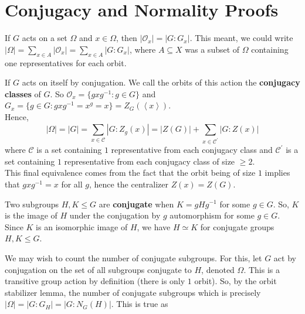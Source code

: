  \section{Conjugacy and Normality Proofs}
\begin{recall}
	If \(G\) acts on a set \(\Omega\) and \(x \in \Omega\), then \(\left| \mathscr{O}_{x} \right| = \left| G : G_{x} \right| \). This meant, we could write \(\left| \Omega \right| = \sum_{x \in A}^{} \left| \mathscr{O}_{x} \right| = \sum_{x \in A}^{}  \left| G : G_{x} \right|  \), where \(A \subseteq X\) was a subset of \(\Omega\) containing one representatives for each orbit.
\end{recall}
\begin{example}
	If \(G\) acts on itself by conjugation. We call the orbits of this action the \textbf{conjugacy classes} of \(G\). So \(\mathscr{O}_{x} = \{gxg^{-1} : g \in G\} \) and \\\(G_{x} = \{g \in G :  gxg^{-1} = x^{g} = x\} = Z_{G} \left( \left<x \right>  \right)  \).\\
	Hence, \[\left| \Omega \right| = \left| G \right| = \sum_{x \in \mathscr{C}}^{} \left| G: Z_{g}\left( x \right)  \right| = \left| Z\left( G \right)  \right|  + \sum_{x \in \mathscr{C}^{\prime}}^{}\left| G : Z\left( x \right)  \right|  \] where \(\mathscr{C}\) is a set containing \(1\) representative from each conjugacy class and \(\mathscr{C}^{\prime}\) is a set containing \(1\) representative from each conjugacy class of size \(\ge 2\).\\
	This final equivalence comes from the fact that the orbit being of size \(1\) implies that \(gxg^{-1} = x\) for all \(g\), hence the centralizer \(Z\left( x \right)  = Z\left( G \right) \).
\end{example}
\begin{definition}
	Two subgroups \(H, K \le G\) are \textbf{conjugate} when \(K = gHg^{-1}\) for some \(g \in G\). So, \(K\) is the image of \(H\) under the conjugation by \(g\) automorphism for some \(g \in G\). Since \(K\) is an isomorphic image of \(H\), we have \(H \simeq K\) for conjugate groups \(H, K \le G\).
\end{definition}
We may wish to count the number of conjugate subgroups. For this, let \(G\) act by conjugation on the set of all subgroups conjugate to \(H\), denoted \(\Omega\). This is a transitive group action by definition (there is only \(1\) orbit). So, by the orbit stabilizer lemma, the number of conjugate subgroups which is precisely \(\left| \Omega \right| = \left| G : G_{H} \right|  = \left| G : N_{G}\left( H \right)  \right| \). This is true as

